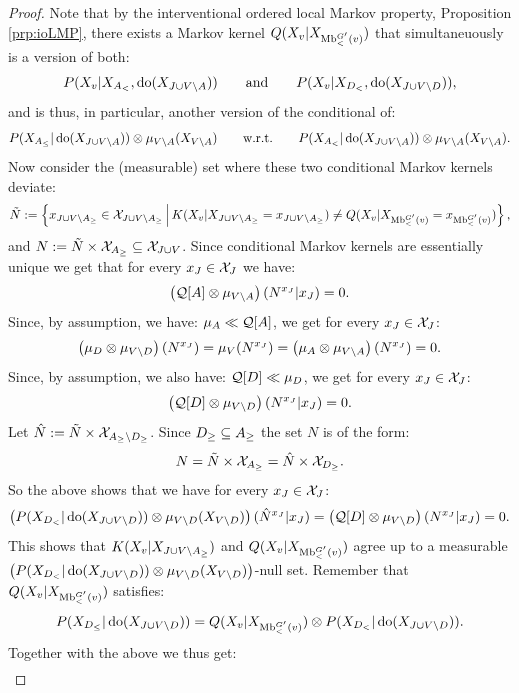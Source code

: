 \begin{Thm}
\begin{proof}
        Note that by the interventional ordered local Markov property, Proposition \ref{prp:ioLMP},
        there exists a Markov kernel $Q(X_v|X_{\mathrm{Mb}^{G'}_<(v)})$ that simultaneuously is a version of both:
        \[ P(X_v|X_{A_<},\operatorname{do}(X_{J\cup V \setminus A})) \qquad \text{and} \qquad P(X_v|X_{D_<},\operatorname{do}(X_{J\cup V \setminus D})), \]
        and is thus, in particular, another version of the conditional of:
        \[  P(X_{A_\le}|\operatorname{do}(X_{J \cup V \setminus A})) \otimes \mu_{V \setminus A}(X_{V \setminus A})  \qquad \text{w.r.t.} \qquad  P(X_{A_<}|\operatorname{do}(X_{J \cup V \setminus A})) \otimes \mu_{V \setminus A}(X_{V \setminus A}). \]
        Now consider the (measurable) set where these two conditional Markov kernels deviate:
        \[ \tilde N := \left \{ x_{J \cup V \setminus A_\ge} \in \mathcal{X}_{J \cup V \setminus A_\ge}  
            \,\middle|\, K(X_v|X_{J \cup V \setminus A_\ge}=x_{J \cup V \setminus A_\ge})
        \neq Q(X_v|X_{\mathrm{Mb}^{G'}_<(v)} = x_{\mathrm{Mb}^{G'}_<(v)}) \right \}, \]
        and $N := \tilde N \times \mathcal{X}_{A_\ge} \subseteq \mathcal{X}_{J \cup V}$.
        Since conditional Markov kernels are essentially unique we get that for every $x_J \in \mathcal{X}_J$ we have:
        \[ \left ( \mathcal{Q}[A] \otimes \mu_{V \setminus A} \right ) (N^{x_J}|x_J) = 0.   \]
        Since, by assumption, we have: $\mu_A \ll \mathcal{Q}[A]$, we get for every $x_J \in \mathcal{X}_J$:
        \[ \left ( \mu_D \otimes \mu_{V \setminus D} \right ) (N^{x_J}) = \mu_V (N^{x_J}) = \left ( \mu_A \otimes \mu_{V \setminus A} \right ) (N^{x_J}) = 0.  \]
        Since, by assumption, we also have: $\mathcal{Q}[D] \ll \mu_D$, we get for every $x_J \in \mathcal{X}_J$:
        \[ \left ( \mathcal{Q}[D] \otimes \mu_{V \setminus D} \right ) (N^{x_J}|x_J) = 0.   \]
        Let $\hat N := \tilde N \times \mathcal{X}_{A_\ge \setminus D_\ge}$.
        Since $D_\ge \subseteq A_\ge$ the set $N$ is of the form:
         \[ N = \tilde N \times \mathcal{X}_{A_\ge} = \hat N \times \mathcal{X}_{D_\ge}. \]
        So the above shows that we have for every $x_J \in \mathcal{X}_J$:
        \[ \left ( P(X_{D_<}|\operatorname{do}(X_{J \cup V \setminus D})) \otimes \mu_{V\setminus D}(X_{V \setminus D}) \right ) (\hat N^{x_J}|x_J) = \left ( \mathcal{Q}[D] \otimes \mu_{V \setminus D} \right ) (N^{x_J}|x_J) = 0.  \]
        This shows that $K(X_v|X_{J \cup V \setminus A_\ge})$ and $Q(X_v|X_{\mathrm{Mb}^{G'}_<(v)})$
        agree up to a measurable \\ $\left ( P(X_{D_<}|\operatorname{do}(X_{J \cup V \setminus D})) \otimes \mu_{V\setminus D}(X_{V \setminus D})\right )$-null set.
        Remember that $Q(X_v|X_{\mathrm{Mb}^{G'}_<(v)})$ satisfies:
        \[ P(X_{D_\le}|\operatorname{do}(X_{J \cup V \setminus D})) = Q(X_v|X_{\mathrm{Mb}^{G'}_<(v)}) \otimes P(X_{D_<}|\operatorname{do}(X_{J \cup V \setminus D})).\]
        Together with the above we thus get:
        \begin{align*} 

\end{align*}
\end{proof}
\end{Thm}
